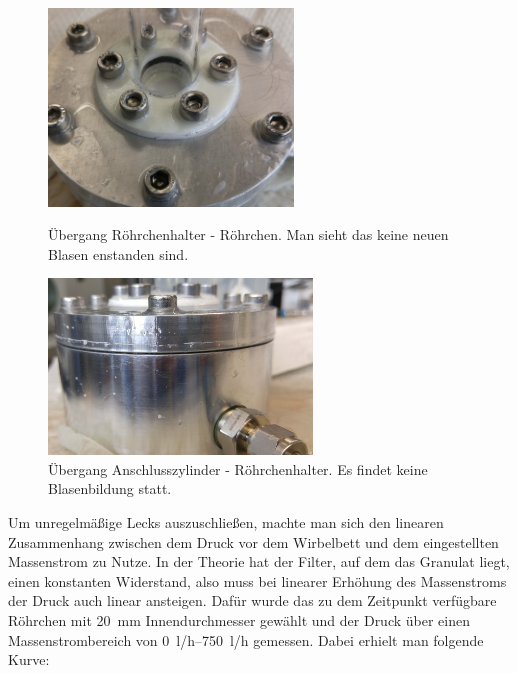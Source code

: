 \begin{figure}[h!]
	\begin{minipage}[hbt]{6.5cm}
		\centering
		\includegraphics[width=6.5cm]{Leck1_nachher.jpg}
		\caption[Leck Röhrchenansatz nachher]{Übergang Röhrchenhalter - Röhrchen. Man sieht das keine neuen Blasen enstanden sind.}
	\end{minipage}
	\hfill
	\begin{minipage}[hbt]{7cm}
		\centering
		\includegraphics[width=7cm]{Leck2_nachher.jpg}
		\caption[Leck Anschlusszylinder nachher]{Übergang Anschlusszylinder - Röhrchenhalter. Es findet keine Blasenbildung statt.}
	\end{minipage}
\end{figure}


Um unregelmäßige Lecks auszuschließen, machte man sich den linearen Zusammenhang zwischen dem Druck vor dem Wirbelbett und dem eingestellten Massenstrom zu Nutze. In der Theorie hat der Filter, auf dem das Granulat liegt, einen konstanten Widerstand, also muss bei linearer Erhöhung des Massenstroms der Druck auch linear ansteigen. Dafür wurde das zu dem Zeitpunkt verfügbare Röhrchen mit \SI{20}{mm} Innendurchmesser gewählt und der Druck über einen Massenstrombereich von \SIrange{0}{750}{l/h} gemessen. Dabei erhielt man folgende Kurve:

